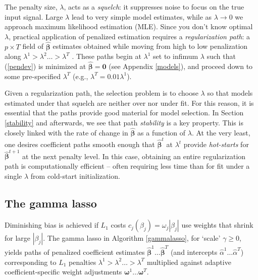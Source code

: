 \documentclass[12pt]{article}
\newcommand{\bs}[1]{\boldsymbol{#1}}
\newcommand{\bm}[1]{\mathbf{#1}}
\begin{document}
The penalty size, $\lambda$, acts as a {\it squelch}: it suppresses noise to
focus on the true input signal. Large $\lambda$ lead to very simple 
model estimates, while as $\lambda \rightarrow 0$ we approach maximum
likelihood estimation (MLE). Since you don't know optimal $\lambda$,
practical application of penalized estimation requires a {\it regularization
path}: a $p \times T$ field of $\bs{\hat\beta}$ estimates obtained while
moving from high to low penalization along $\lambda^1 > \lambda^2 \ldots >
\lambda^T$ \citep[e.g., LARS in][is a well known example]{efron_least_2004}.
These paths begin at $\lambda^1$ set to infimum $\lambda$ such that
(\ref{pendev}) is minimized at $\bs{\hat\beta} = \bm{0}$ (see Appendix
\ref{models}), and proceed down to some pre-specified $\lambda^T$ (e.g., $\lambda^T=
0.01\lambda^1$).

Given a regularization path, the selection problem is to choose $\lambda$
so that models estimated under that  squelch are neither over nor under fit.
For this reason, it is essential that the paths provide good material for
model selection.  In Section \ref{stability} and afterwards, we see that path
{\it stability} is a key property.  This is closely linked with the
rate of change in $\bs{\hat\beta}$ as a function of $\lambda$.  At the very
least, one desires coefficient paths  smooth enough that $\bs{\hat\beta}^t$ at
$\lambda^t$ provide {\it hot-starts} for $\bs{\hat\beta}^{t+1}$ at the next
penalty level. In this case, obtaining an entire regularization path
is  computationally efficient -- often requiring less time than for fit under
a single $\lambda$ from cold-start initialization.



\subsection{The gamma lasso}
\label{glsec}

Diminishing bias is achieved if $L_1$ costs $c_j(\beta_j) = \omega_j
|\beta_j|$ use weights that  shrink for large $|\beta_j|$. The gamma lasso in
Algorithm \ref{gammalasso}, for `scale' $\gamma \geq 0$, yields paths of
penalized coefficient estimates $\bs{\hat\beta}^1 \ldots
\bs{\hat\beta}^T$ (and intercepts $\hat\alpha^1 \ldots \hat\alpha^T$)
corresponding to $L_1$ penalties $\lambda^1 > \lambda^2 \ldots > \lambda^T$
multiplied against adaptive coefficient-specific weight adjustments
$\bs{\omega}^1 \ldots \bs{\omega}^T$.
\end{document}
